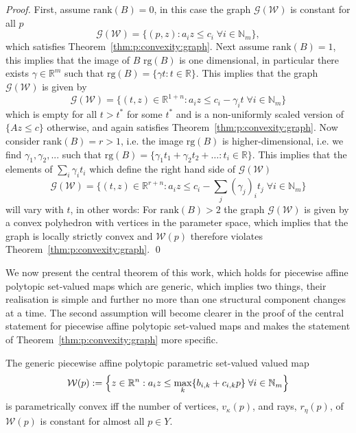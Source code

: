 \documentclass[smallextended]{svjour3}       %
\numberwithin{equation}{section}
\begin{document}
\begin{proof}
First, assume $\text{rank}(B)=0$, in this case the graph $\mathscr G(\mathcal W)$ is constant for all $p$
%
\begin{equation*}
	\mathscr G(\mathcal W) = \{(p,z):a_i z\leq c_i \; \forall i\in\mathbb N_m\},
\end{equation*}
%
which satisfies Theorem~\ref{thm:p:convexity:graph}.
%
Next assume $\text{rank}(B)=1$, this implies that the image of $B$ $\text{rg}(B)$ is one dimensional, in particular there exists $\gamma\in\mathbb{R}^m$ such that $\text{rg}(B) = \{\gamma t: t\in\mathbb R\}$.
%
This implies that the graph $\mathscr G(\mathcal W)$ is given by
%
\begin{equation*}
  \mathscr G(\mathcal W) = \{(t,z)\in\mathbb R^{1+n}:a_i z\leq c_i-\gamma_i t \; \forall i\in\mathbb N_m\}
\end{equation*}
%
which is empty for all $t>t^\ast$ for some $t^\ast$ and is a non-uniformly scaled version of $\{Az\leq c\}$ otherwise, and again satisfies Theorem~\ref{thm:p:convexity:graph}.
%
Now consider $\text{rank}(B)=r>1$, i.e. the image $\text{rg}(B)$ is higher-dimensional, i.e. we find $\gamma_1,\gamma_2,...$ such that $\text{rg}(B) = \{\gamma_1t_1+\gamma_2t_2+\dots:t_i\in \mathbb R\}$.
%
This implies that the elements of $\sum_i\gamma_i t_i$ which define the right hand side of $\mathscr{G}(\mathcal W)$
%
\begin{equation*}
  \mathscr G(\mathcal W) = \{(t,z)\in\mathbb R^{r+n}:a_i z\leq c_i-\sum_j(\gamma_j)_i t_j \; \forall i\in\mathbb N_m\}
\end{equation*}
%
will vary with $t$, in other words: 
%
For $\text{rank}(B)>2$ the graph $\mathscr G(\mathcal W)$ is given by a convex polyhedron with vertices in the parameter space, which implies that the graph is locally strictly convex and $\mathcal W(p)$ therefore violates Theorem~\ref{thm:p:convexity:graph}.
\qed
\end{proof}
%
We now present the central theorem of this work, which holds for piecewise affine polytopic set-valued maps which are generic, which implies two things, their realisation is simple and further no more than one structural component changes at a time. 
%
The second assumption will become clearer in the proof of the central statement for piecewise affine polytopic set-valued maps and makes the statement of Theorem~\ref{thm:p:convexity:graph} more specific.
%
\begin{corollary}\label{thm:p:convexity:PWA:set:constant:num:verts}
The generic piecewise affine polytopic parametric set-valued valued map 
%
\begin{equation}\label{eq:definition:PWA:polytopic:set:general}
  \mathcal W(p) := \Bigl\{z\in\mathbb R^n: a_i z \leq \max_{k}\{b_{i,k} + c_{i,k}p\} \; \forall i\in\mathbb N_m \Bigr\}
\end{equation}
%
is parametrically convex iff the number of vertices, $v_\kappa(p)$, and rays, $r_\eta(p)$, of~$\mathcal W(p)$ is constant for almost all $p\in Y$.
\end{corollary}
\end{document}
